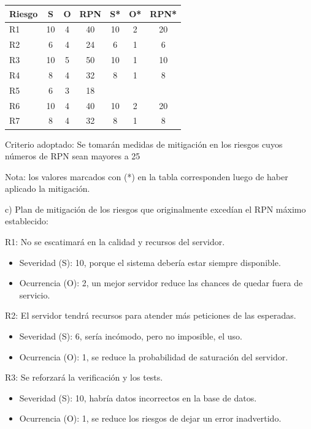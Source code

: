 \documentclass[11pt]{charter}
\begin{document}
\begin{table}[htpb]
\centering
\begin{tabularx}{\linewidth}{@{}|X|c|c|c|c|c|c|@{}}
\hline
\rowcolor[HTML]{C0C0C0} 
Riesgo & S & O & RPN & S* & O* & RPN* \\ \hline
R1 & 10 & 4 & 40 & 10 & 2 & 20    \\ \hline
R2 & 6 & 4 & 24 & 6 & 1 & 6   \\ \hline
R3 & 10 & 5 & 50 & 10 & 1 & 10   \\ \hline
R4 & 8 & 4 & 32 & 8 & 1 & 8   \\ \hline
R5 & 6 & 3 & 18 &  &  &    \\ \hline
R6 & 10 & 4 & 40 & 10 & 2 & 20   \\ \hline
R7 & 8 & 4 & 32 & 8 & 1 & 8    \\ \hline
\end{tabularx}%
\end{table}

Criterio adoptado: 
Se tomarán medidas de mitigación en los riesgos cuyos números de RPN sean mayores a 25

Nota: los valores marcados con (*) en la tabla corresponden luego de haber aplicado la mitigación.

c) Plan de mitigación de los riesgos que originalmente excedían el RPN máximo establecido:

R1: No se escatimará en la calidad y recursos del servidor.
\begin{itemize}
\item Severidad (S): 10, porque el sistema debería estar siempre disponible.
\item Ocurrencia (O): 2, un mejor servidor reduce las chances de quedar fuera de servicio.
\end{itemize}

R2: El servidor tendrá recursos para atender más peticiones de las esperadas.
\begin{itemize}
\item Severidad (S): 6, sería incómodo, pero no imposible, el uso.
\item Ocurrencia (O): 1, se reduce la probabilidad de saturación del servidor.
\end{itemize}

R3: Se reforzará la verificación y los tests.
\begin{itemize}
\item Severidad (S): 10, habría datos incorrectos en la base de datos. 
\item Ocurrencia (O): 1, se reduce los riesgos de dejar un error inadvertido.
\end{itemize}
\end{document}
